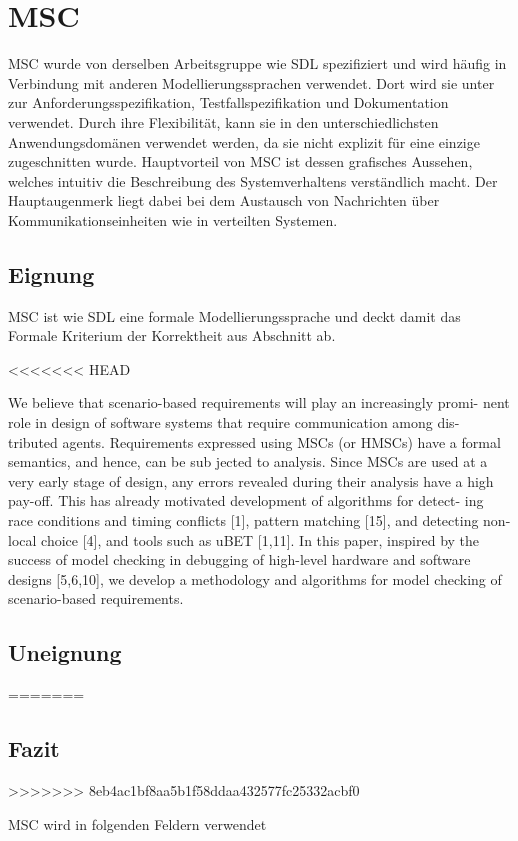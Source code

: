 \section{MSC}
\label{sc:MSCB}
\ac{MSC} wurde von derselben Arbeitsgruppe wie \ac{SDL} spezifiziert und wird häufig in Verbindung mit anderen Modellierungssprachen verwendet. Dort wird sie unter zur Anforderungsspezifikation, Testfallspezifikation und Dokumentation verwendet. Durch ihre Flexibilität, kann sie in den unterschiedlichsten Anwendungsdomänen verwendet werden, da sie nicht explizit für eine einzige zugeschnitten wurde. Hauptvorteil von \ac{MSC} ist dessen grafisches Aussehen, welches intuitiv die Beschreibung des Systemverhaltens verständlich macht. Der Hauptaugenmerk liegt dabei bei dem Austausch von Nachrichten über Kommunikationseinheiten wie in verteilten Systemen.
\subsection{Eignung}
\label{sc:MSCEignung}
\ac{MSC} ist wie \ac{SDL} eine formale Modellierungssprache und deckt damit das Formale Kriterium der Korrektheit aus Abschnitt \pageref{ssc:Korrektheit} ab. 

<<<<<<< HEAD

We believe that scenario-based requirements will play an increasingly promi-
nent role in design of software systems that require communication among dis-
tributed agents. Requirements expressed using MSCs (or HMSCs) have a formal
semantics, and hence, can be sub jected to analysis. Since MSCs are used at
a very early stage of design, any errors revealed during their analysis have a
high pay-off. This has already motivated development of algorithms for detect-
ing race conditions and timing conﬂicts [1], pattern matching [15], and detecting
non-local choice [4], and tools such as uBET [1,11]. In this paper, inspired by
the success of model checking in debugging of high-level hardware and software
designs [5,6,10], we develop a methodology and algorithms for model checking
of scenario-based requirements.
\subsection{Uneignung}
\label{sc:MSCUnEignung}
=======
\subsection{Fazit}
\label{sc:MSCFazit}
>>>>>>> 8eb4ac1bf8aa5b1f58ddaa432577fc25332acbf0


MSC wird in folgenden Feldern verwendet
